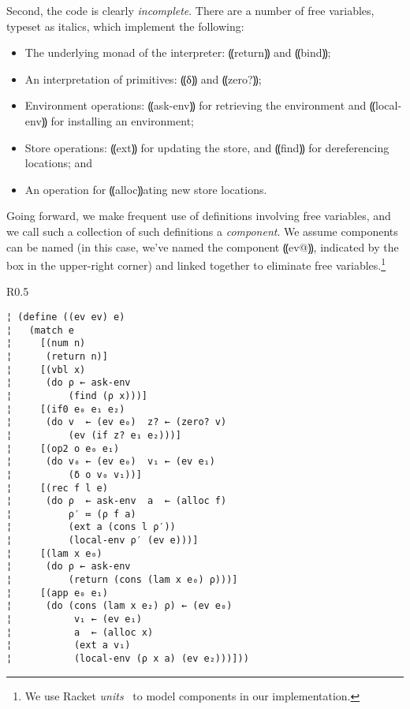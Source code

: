 Second, the code is clearly \emph{incomplete}.  There are a number of free
variables, typeset as italics, which implement the following:
\begin{itemize}
\item The underlying monad of the interpreter: ⸨return⸩ and ⸨bind⸩;
\item An interpretation of primitives: ⸨δ⸩ and ⸨zero?⸩;
\item Environment operations: ⸨ask-env⸩ for retrieving the
environment and ⸨local-env⸩ for installing an environment;
\item Store operations: ⸨ext⸩ for updating the store, and ⸨find⸩ for
dereferencing locations; and
\item An operation for ⸨alloc⸩ating new store locations.
\end{itemize}
Going forward, we make frequent use of definitions involving free variables,
and we call such a collection of such definitions a \emph{component}. We assume
components can be named (in this case, we've named the component ⸨ev@⸩,
indicated by the box in the upper-right corner) and linked together to
eliminate free variables.\footnote{We use Racket
\emph{units}~\cite{local:flatt-pldi98} to model components in our
implementation.}

\begin{wrapfigure}[24]{R}{0.5\textwidth} %
\begin{mdframed}
\begin{lstlisting}
¦ (define ((ev ev) e)
¦   (match e
¦     [(num n)
¦      (return n)]
¦     [(vbl x)
¦      (do ρ ← ask-env
¦          (find (ρ x)))]    
¦     [(if0 e₀ e₁ e₂)
¦      (do v  ← (ev e₀)  z? ← (zero? v)
¦          (ev (if z? e₁ e₂)))]
¦     [(op2 o e₀ e₁)
¦      (do v₀ ← (ev e₀)  v₁ ← (ev e₁)
¦          (δ o v₀ v₁))]
¦     [(rec f l e)
¦      (do ρ  ← ask-env  a  ← (alloc f)
¦          ρ′ ≔ (ρ f a)
¦          (ext a (cons l ρ′))
¦          (local-env ρ′ (ev e)))]
¦     [(lam x e₀)
¦      (do ρ ← ask-env
¦          (return (cons (lam x e₀) ρ)))]
¦     [(app e₀ e₁)
¦      (do (cons (lam x e₂) ρ) ← (ev e₀)
¦           v₁ ← (ev e₁)
¦           a  ← (alloc x)
¦           (ext a v₁)
¦           (local-env (ρ x a) (ev e₂)))]))
\end{lstlisting}
\label{f:interpreter}
\end{mdframed}
\end{wrapfigure} %


